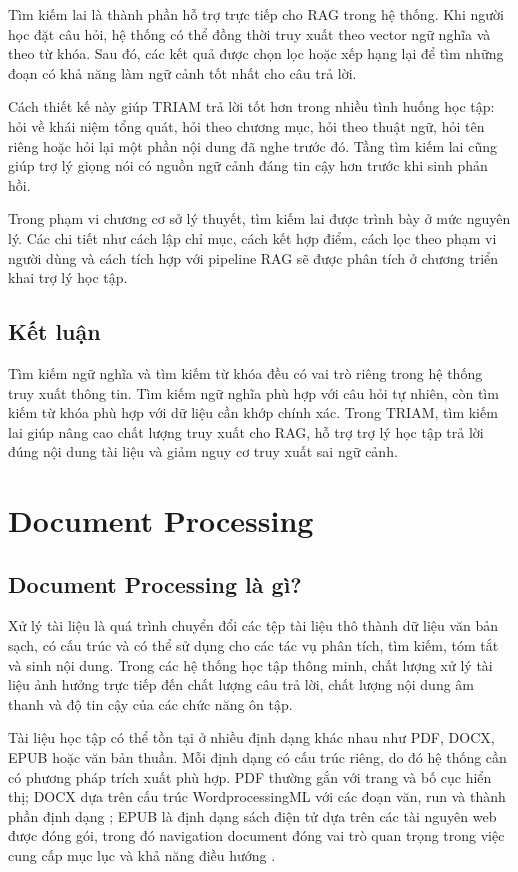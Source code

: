 \documentclass[12pt,a4paper]{report}
\begin{document}
Tìm kiếm lai là thành phần hỗ trợ trực tiếp cho RAG trong hệ thống. Khi người học đặt câu hỏi, hệ thống có thể đồng thời truy xuất theo vector ngữ nghĩa và theo từ khóa. Sau đó, các kết quả được chọn lọc hoặc xếp hạng lại để tìm những đoạn có khả năng làm ngữ cảnh tốt nhất cho câu trả lời.

Cách thiết kế này giúp TRIAM trả lời tốt hơn trong nhiều tình huống học tập: hỏi về khái niệm tổng quát, hỏi theo chương mục, hỏi theo thuật ngữ, hỏi tên riêng hoặc hỏi lại một phần nội dung đã nghe trước đó. Tầng tìm kiếm lai cũng giúp trợ lý giọng nói có nguồn ngữ cảnh đáng tin cậy hơn trước khi sinh phản hồi.

Trong phạm vi chương cơ sở lý thuyết, tìm kiếm lai được trình bày ở mức nguyên lý. Các chi tiết như cách lập chỉ mục, cách kết hợp điểm, cách lọc theo phạm vi người dùng và cách tích hợp với pipeline RAG sẽ được phân tích ở chương triển khai trợ lý học tập.

\subsection{Kết luận}

Tìm kiếm ngữ nghĩa và tìm kiếm từ khóa đều có vai trò riêng trong hệ thống truy xuất thông tin. Tìm kiếm ngữ nghĩa phù hợp với câu hỏi tự nhiên, còn tìm kiếm từ khóa phù hợp với dữ liệu cần khớp chính xác. Trong TRIAM, tìm kiếm lai giúp nâng cao chất lượng truy xuất cho RAG, hỗ trợ trợ lý học tập trả lời đúng nội dung tài liệu và giảm nguy cơ truy xuất sai ngữ cảnh.

\section{Document Processing}

\subsection{Document Processing là gì?}

Xử lý tài liệu là quá trình chuyển đổi các tệp tài liệu thô thành dữ liệu văn bản sạch, có cấu trúc và có thể sử dụng cho các tác vụ phân tích, tìm kiếm, tóm tắt và sinh nội dung. Trong các hệ thống học tập thông minh, chất lượng xử lý tài liệu ảnh hưởng trực tiếp đến chất lượng câu trả lời, chất lượng nội dung âm thanh và độ tin cậy của các chức năng ôn tập.

Tài liệu học tập có thể tồn tại ở nhiều định dạng khác nhau như PDF, DOCX, EPUB hoặc văn bản thuần. Mỗi định dạng có cấu trúc riêng, do đó hệ thống cần có phương pháp trích xuất phù hợp. PDF thường gắn với trang và bố cục hiển thị; DOCX dựa trên cấu trúc WordprocessingML với các đoạn văn, run và thành phần định dạng \cite{microsoftOpenXmlDocs}; EPUB là định dạng sách điện tử dựa trên các tài nguyên web được đóng gói, trong đó navigation document đóng vai trò quan trọng trong việc cung cấp mục lục và khả năng điều hướng \cite{w3cEpub33}.
\end{document}

